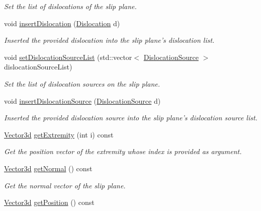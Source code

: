 \begin{DoxyCompactItemize}
\begin{DoxyCompactList}\small\item\em \-Set the list of dislocations of the slip plane. \end{DoxyCompactList}\item 
void \hyperlink{classSlipPlane_a9b32c4274862b8386d0f62c8ef1bb4fc}{insert\-Dislocation} (\hyperlink{classDislocation}{\-Dislocation} d)
\begin{DoxyCompactList}\small\item\em \-Inserted the provided dislocation into the slip plane's dislocation list. \end{DoxyCompactList}\item 
void \hyperlink{classSlipPlane_a6f520005b3c7e8c93df0b893201cea29}{set\-Dislocation\-Source\-List} (std\-::vector$<$ \hyperlink{classDislocationSource}{\-Dislocation\-Source} $>$ dislocation\-Source\-List)
\begin{DoxyCompactList}\small\item\em \-Set the list of dislocation sources on the slip plane. \end{DoxyCompactList}\item 
void \hyperlink{classSlipPlane_a54a2ddaa9b1c10f042a12a101019bf95}{insert\-Dislocation\-Source} (\hyperlink{classDislocationSource}{\-Dislocation\-Source} d)
\begin{DoxyCompactList}\small\item\em \-Inserted the provided dislocation source into the slip plane's dislocation source list. \end{DoxyCompactList}\item 
\hyperlink{classVector3d}{\-Vector3d} \hyperlink{classSlipPlane_a1df9437ef558f9dc7ec9fba62371e5e4}{get\-Extremity} (int i) const 
\begin{DoxyCompactList}\small\item\em \-Get the position vector of the extremity whose index is provided as argument. \end{DoxyCompactList}\item 
\hyperlink{classVector3d}{\-Vector3d} \hyperlink{classSlipPlane_a2b8043348d0b48318c0f3b6b9a43b5bc}{get\-Normal} () const 
\begin{DoxyCompactList}\small\item\em \-Get the normal vector of the slip plane. \end{DoxyCompactList}\item 
\hyperlink{classVector3d}{\-Vector3d} \hyperlink{classSlipPlane_a7ff7aec8b12e5711b3e01448a558200c}{get\-Position} () const 

\end{DoxyCompactItemize}

